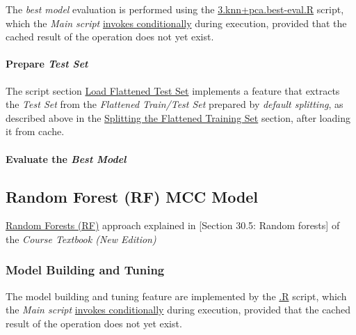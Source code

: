 \documentclass[
]{report}
\begin{document}
The \emph{best model} evaluation is performed using the \href{https://github.com/AzKurban-edX-DS/edx.capstone.choose-your-own/blob/main/r/models/knn\%2Bpca-mcc/3.knn\%2Bpca.best-eval.R}{3.knn+pca.best-eval.R} script, which the \emph{Main script} \href{https://github.com/AzKurban-edX-DS/edx.capstone.choose-your-own/blob/main/r/index.R\#L227}{invokes conditionally} during execution, provided that the cached result of the operation does not yet exist.

\paragraph{\texorpdfstring{Prepare \emph{Test Set}}{Prepare Test Set}}\label{knn_pca_mcc.eval.test_set}

\hfill\break

The script section \href{https://github.com/AzKurban-edX-DS/edx.capstone.choose-your-own/blob/main/r/models/knn\%2Bpca-mcc/3.knn\%2Bpca.best-eval.R\#L14-L81}{Load Flattened Test Set} implements a feature that extracts the \emph{Test Set} from the \emph{Flattened Train/Test Set} prepared by \emph{default splitting}, as described above in the \hyperref[splitting-the-flattened-training-set]{Splitting the Flattened Training Set} section, after loading it from cache.

\paragraph{\texorpdfstring{Evaluate the \emph{Best Model}}{Evaluate the Best Model}}\label{knn_pca_mcc.best.eval}

\hfill\break

\subsection{Random Forest (RF) MCC Model}\label{rf_model}

\href{https://rafalab.dfci.harvard.edu/dsbook-part-2/ml/algorithms.html\#sec-random-forests}{Random Forests (RF)} approach explained in {[}Section 30.5: Random forests{]} of the \emph{Course Textbook (New Edition)}\autocite{IDS2_30.5}

\subsubsection{Model Building and Tuning}\label{rf.build}

The model building and tuning feature are implemented by the \href{}{.R} script, which the \emph{Main script} \href{https://github.com/AzKurban-edX-DS/edx.capstone.choose-your-own/blob/main/r/index.R\#L}{invokes conditionally} during execution, provided that the cached result of the operation does not yet exist.
\end{document}
